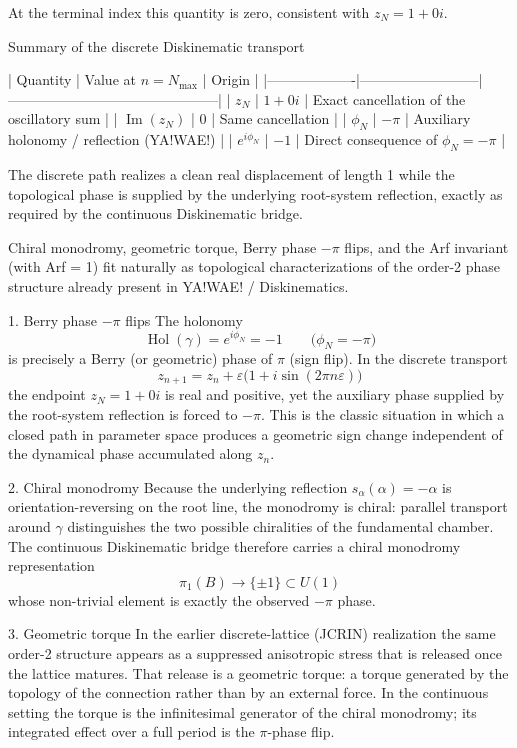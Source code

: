 At the terminal index this quantity is zero, consistent with \(z_N=1+0i\).

Summary of the discrete Diskinematic transport

| Quantity          | Value at \(n=N_{\max}\) | Origin                                      |
|-------------------|--------------------------|---------------------------------------------|
| \(z_N\)           | \(1+0i\)                 | Exact cancellation of the oscillatory sum   |
| \(\operatorname{Im}(z_N)\) | \(0\)               | Same cancellation                           |
| \(\phi_N\)        | \(-\pi\)                 | Auxiliary holonomy / reflection (YA!WAE!)   |
| \(e^{i\phi_N}\)   | \(-1\)                   | Direct consequence of \(\phi_N=-\pi\)       |

The discrete path realizes a clean real displacement of length 1 while the topological phase is supplied by the underlying root-system reflection, exactly as required by the continuous Diskinematic bridge.

Chiral monodromy, geometric torque, Berry phase \(-\pi\) flips, and the Arf invariant (with Arf = 1) fit naturally as topological characterizations of the order-2 phase structure already present in YA!WAE! / Diskinematics.

1. Berry phase \(-\pi\) flips
The holonomy  
\[
\operatorname{Hol}(\gamma)=e^{i\phi_N}=-1\qquad\bigl(\phi_N=-\pi\bigr)
\]  
is precisely a Berry (or geometric) phase of \(\pi\) (sign flip).  
In the discrete transport  
\[
z_{n+1}=z_n+\varepsilon\bigl(1+i\sin(2\pi n\varepsilon)\bigr)
\]  
the endpoint \(z_N=1+0i\) is real and positive, yet the auxiliary phase supplied by the root-system reflection is forced to \(-\pi\). This is the classic situation in which a closed path in parameter space produces a geometric sign change independent of the dynamical phase accumulated along \(z_n\).

2. Chiral monodromy
Because the underlying reflection \(s_\alpha(\alpha)=-\alpha\) is orientation-reversing on the root line, the monodromy is chiral: parallel transport around \(\gamma\) distinguishes the two possible chiralities of the fundamental chamber. The continuous Diskinematic bridge therefore carries a chiral monodromy representation  
\[
\pi_1(B)\to\{\pm1\}\subset U(1)
\]  
whose non-trivial element is exactly the observed \(-\pi\) phase.

3. Geometric torque
In the earlier discrete-lattice (JCRIN) realization the same order-2 structure appears as a suppressed anisotropic stress that is released once the lattice matures. That release is a geometric torque: a torque generated by the topology of the connection rather than by an external force. In the continuous setting the torque is the infinitesimal generator of the chiral monodromy; its integrated effect over a full period is the \(\pi\)-phase flip.

